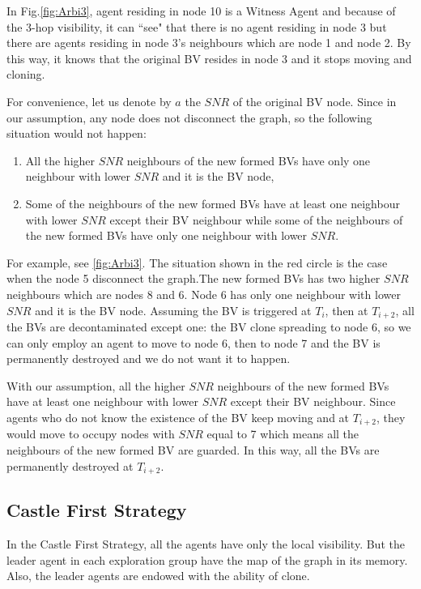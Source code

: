 In Fig.\ref{fig:Arbi3}, agent residing in node 10 is a Witness Agent and because of the 3-hop visibility, it can ``see" that there is no agent residing in node 3 but there are agents residing in node 3's neighbours which are node 1 and node 2. By this way, it knows that the original BV resides in node 3 and it stops moving and cloning.

For convenience, let us denote by $a$ the $SNR$ of the original BV node. Since in our assumption, any node does not disconnect the graph, so the following situation would not happen:
\begin{enumerate}
\item All the higher $SNR$ neighbours of the new formed BVs have only one neighbour with lower $SNR$ and it is the BV node, \item Some of the neighbours of the new formed BVs have at least one neighbour with lower $SNR$ except their BV neighbour while some of the neighbours of the new formed BVs have only one neighbour with lower $SNR$.
\end{enumerate}
For example, see \ref{fig:Arbi3}. The situation shown in the red circle is the case when the node 5 disconnect the graph.The new formed BVs has two higher $SNR$ neighbours which are nodes 8 and 6. Node 6 has only one neighbour with lower $SNR$ and it is the BV node. Assuming the BV is triggered at $T_i$, then at $T_{i+2}$, all the BVs are decontaminated except one: the BV clone spreading to node 6, so we can only employ an agent to move to node 6, then to node 7 and the BV is permanently destroyed and we do not want it to happen.

With our assumption, all the higher $SNR$ neighbours of the new formed BVs have at least one neighbour with lower $SNR$ except their BV neighbour.  Since agents who do not know the existence of the BV keep moving and at $T_{i+2}$, they would move to occupy nodes with $SNR$ equal to 7 which means all the neighbours of the new formed BV are guarded. In this way, all the BVs are permanently destroyed at $T_{i+2}$.

               
\subsection{Castle First Strategy}
In the Castle First Strategy, all the agents have only the local visibility. But the leader agent in each exploration group have the map of the graph in its memory. Also, the leader agents are endowed with the ability of clone.

